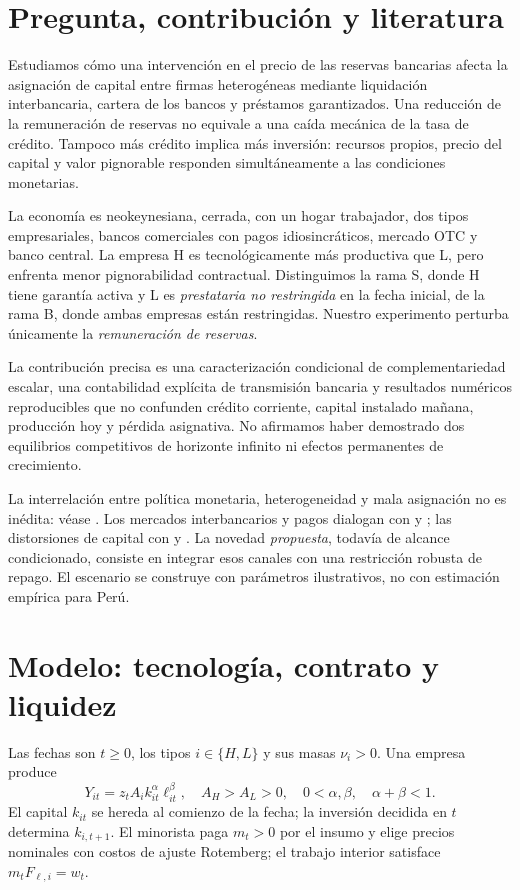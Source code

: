 \section{Pregunta, contribución y literatura}\label{sec:compact_question}
Estudiamos cómo una intervención en el precio de las reservas bancarias
afecta la asignación de capital entre firmas heterogéneas mediante
liquidación interbancaria, cartera de los bancos y préstamos garantizados.
Una reducción de la remuneración de reservas no equivale a una caída
mecánica de la tasa de crédito. Tampoco más crédito implica más
inversión: recursos propios, precio del capital y valor pignorable
responden simultáneamente a las condiciones monetarias.

La economía es neokeynesiana, cerrada, con un hogar trabajador, dos
tipos empresariales, bancos comerciales con pagos idiosincráticos,
mercado OTC y banco central. La empresa H es tecnológicamente más
productiva que L, pero enfrenta menor pignorabilidad contractual.
Distinguimos la rama S, donde H tiene garantía activa y L es
\emph{prestataria no restringida} en la fecha inicial, de la rama B,
donde ambas empresas están restringidas. Nuestro experimento
perturba únicamente la \emph{remuneración de reservas}.

La contribución precisa es una caracterización condicional de
complementariedad escalar, una contabilidad explícita de transmisión
bancaria y resultados numéricos reproducibles que no confunden
crédito corriente, capital instalado mañana, producción hoy y
pérdida asignativa. No afirmamos haber demostrado dos equilibrios
competitivos de horizonte infinito ni efectos permanentes de
crecimiento.

La interrelación entre política monetaria, heterogeneidad y mala
asignación no es inédita: véase \citet{gonzalez2026}. Los mercados
interbancarios y pagos dialogan con \citet{bianchi2022} y
\citet{bigioSannikov2023}; las distorsiones de capital con
\citet{midrigan2014} y \citet{gopinath2017}. La novedad
\emph{propuesta}, todavía de alcance condicionado, consiste en
integrar esos canales con una restricción robusta de repago.
El escenario se construye con parámetros ilustrativos, no con
estimación empírica para Perú.

\section{Modelo: tecnología, contrato y liquidez}\label{sec:compact_economy}
Las fechas son \(t\geq 0\), los tipos \(i\in\{H,L\}\) y sus
masas \(\nu_i>0\). Una empresa produce
\begin{equation}\label{eq:compact_technology}
Y_{it}=z_tA_i k_{it}^{\alpha}\ell_{it}^{\beta},
\quad A_H>A_L>0,\quad 0<\alpha,\beta,\quad \alpha+\beta<1.
\end{equation}
El capital \(k_{it}\) se hereda al comienzo de la fecha; la
inversión decidida en \(t\) determina \(k_{i,t+1}\). El minorista
paga \(m_t>0\) por el insumo y elige precios nominales con costos
de ajuste Rotemberg; el trabajo interior satisface
\(m_tF_{\ell,i}=w_t\).

